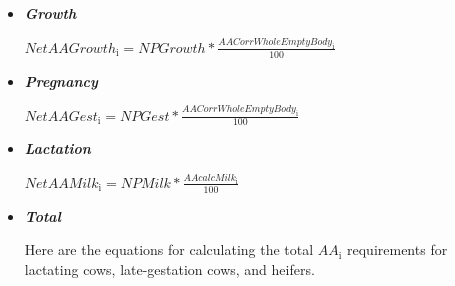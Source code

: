 \documentclass{article}
\begin{document}
\begin{refsection}
\begin{itemize}
\begin{enumerate}
        \item \underline {Endogenous Urinary Protein}
        \vspace{0.2cm}

    \begin{center}
    \(NetAAEndUrine_{\text{i}} = 0.010 * 6.2.5 * BW * \frac{AACorrWholeEmptyBody_{\text{i}}}{100}\)
    \end{center}

        \item \underline {Metabolic Fecal Protein}
        \vspace{0.2cm}

    \begin{center}
    \(NetAAMFP_{\text{i}} = NPMFP * \frac{AACorrMFP_{\text{i}}}{100}\)
    \end{center}
    \end{enumerate}
    \vspace{0.25cm}

    \item \textbf{\textit{Growth}} 
    \vspace{0.25cm}

    \begin{center}
    \(NetAAGrowth_{\text{i}} = NPGrowth * \frac{AACorrWholeEmptyBody_{\text{i}}}{100}\)
    \end{center}
    \vspace{0.25cm}

    \item \textbf{\textit{Pregnancy}} 
    \vspace{0.25cm}

    \begin{center}
    \(NetAAGest_{\text{i}} = NPGest * \frac{AACorrWholeEmptyBody_{\text{i}}}{100}\)
    \end{center}
    \vspace{0.25cm}

    \item \textbf{\textit{Lactation}} 
    \vspace{0.25cm}

    \begin{center}
    \(NetAAMilk_{\text{i}} = NPMilk * \frac{AAcalcMilk_{\text{i}}}{100}\)
    \end{center}
    \vspace{0.25cm}


    \item \textbf{\textit{Total}} 
    
    Here are the equations for calculating the total \(AA_{\text{i}}\) requirements for lactating cows, late-gestation cows, and heifers. 
    \vspace{0.2cm}
    

\end{itemize}
\end{refsection}
\end{document}
